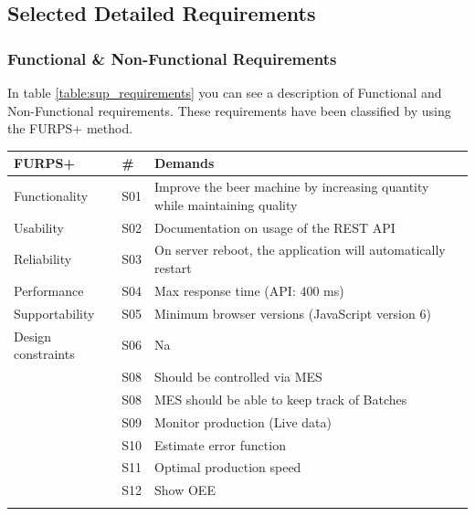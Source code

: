 \subsection{Selected Detailed Requirements}

\subsubsection{Functional \& Non-Functional Requirements}
In table \ref{table:sup_requirements} you can see a description of Functional and
Non-Functional requirements. These requirements have been classified by using
the FURPS+ method.

\begin{table}[H]
    \begin{tabularx}{\textwidth}{|>{\RaggedRight}p{5.25cm}|>{\RaggedRight}p{0.6cm}|>{\RaggedRight}X|}
        \hline
        \textbf{FURPS+}  & \textbf{\#} & \textbf{Demands} \\
        \hline
        Functionality  	& S01 & Improve the beer machine by increasing quantity while maintaining quality \\
        \hline
        Usability      	& S02 & Documentation on usage of the REST API \\
        \hline
        Reliability    	& S03 & On server reboot, the application will automatically restart \\
        \hline
        Performance    	& S04 & Max response time (API: 400 ms) \\
        \hline
        Supportability 	& S05 & Minimum browser versions (JavaScript version 6)\\
        \hline
        Design constraints 	& S06 & Na \\
        \hline
        \multirow{5}{*}{Implementation requirements} & S08 & Should be controlled via MES\\
        \cline{2-3}
                & S08 & MES should be able to keep track of Batches\\
        \cline{2-3}
                & S09 & Monitor production (Live data)\\
        \cline{2-3}
                & S10 & Estimate error function\\
        \cline{2-3}
                & S11 & Optimal production speed\\
        \hline
        \multirow{14}{*}{Interface requirements } & S12 & Show OEE \\
        \cline{2-3}

\end{tabularx}
\end{table}
